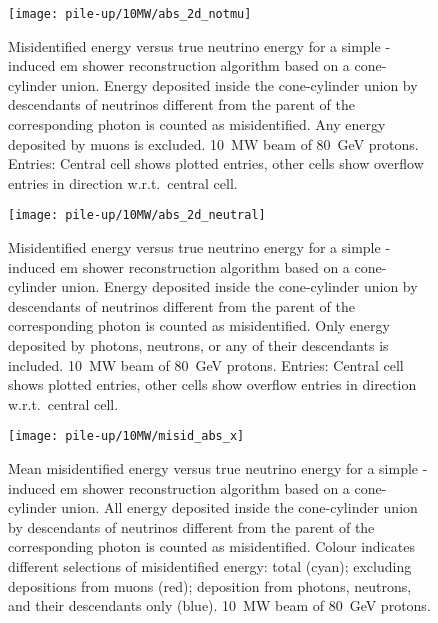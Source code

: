 \begin{figure}[tbp]
	\centering
	\texttt{[image: pile-up/10MW/abs\_2d\_notmu]}
	\caption[Pile-up study misidentified vs.\ true neutrino energy, no muons, \SI{10}{\mega\watt} beam]{%
		Misidentified energy versus true neutrino energy for a simple \Pgpz-induced \acrshort{em} shower reconstruction algorithm based on a cone-cylinder union.
		Energy deposited inside the cone-cylinder union by descendants of neutrinos different from the parent of the corresponding \Pgpz photon is counted as misidentified.
		Any energy deposited by muons is excluded.
		\SI{10}{\mega\watt} beam of \SI{80}{\giga\electronvolt} protons.
		Entries: Central cell shows plotted entries, other cells show overflow entries in direction w.r.t.\ central cell.
	}
\end{figure}

\begin{figure}[tbp]
	\centering
	\texttt{[image: pile-up/10MW/abs\_2d\_neutral]}
	\caption[Pile-up study misidentified vs.\ true neutrino energy, only neutrals, \SI{10}{\mega\watt} beam]{%
		Misidentified energy versus true neutrino energy for a simple \Pgpz-induced \acrshort{em} shower reconstruction algorithm based on a cone-cylinder union.
		Energy deposited inside the cone-cylinder union by descendants of neutrinos different from the parent of the corresponding \Pgpz photon is counted as misidentified.
		Only energy deposited by photons, neutrons, or any of their descendants is included.
		\SI{10}{\mega\watt} beam of \SI{80}{\giga\electronvolt} protons.
		Entries: Central cell shows plotted entries, other cells show overflow entries in direction w.r.t.\ central cell.
	}
\end{figure}

\begin{figure}[tbp]
	\centering
	\texttt{[image: pile-up/10MW/misid\_abs\_x]}
	\caption[Pile-up study mean misidentified vs.\ true neutrino energy, \SI{10}{\mega\watt} beam]{%
		Mean misidentified energy versus true neutrino energy for a simple \Pgpz-induced \acrshort{em} shower reconstruction algorithm based on a cone-cylinder union.
		All energy deposited inside the cone-cylinder union by descendants of neutrinos different from the parent of the corresponding \Pgpz photon is counted as misidentified.
		Colour indicates different selections of misidentified energy: total (cyan); excluding depositions from muons (red); deposition from photons, neutrons, and their descendants only (blue).
		\SI{10}{\mega\watt} beam of \SI{80}{\giga\electronvolt} protons.
	}
\end{figure}

